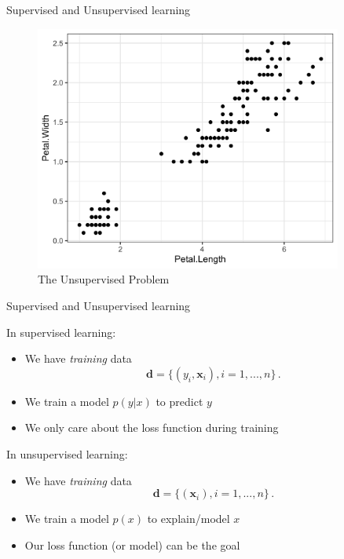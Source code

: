 \documentclass[10pt]{beamer}
\begin{document}
\begin{frame}{Supervised and Unsupervised learning}

\begin{figure}[h]
\centering
\includegraphics[width=0.9\textwidth]{fig/iris_unsupervised.png}
\caption{The Unsupervised Problem}
\end{figure}

\end{frame}


\begin{frame}{Supervised and Unsupervised learning}

In {\color{uured} supervised} learning:
\begin{itemize}
\item We have \emph{training} data
\[
\mathbf{d} = \{(y_i, \mathbf{x}_i), i = 1, ..., n\} \,.
\]
\item We train a model $p(y|x)$ to {\color{uured} predict} $y$
\item We only care about the loss function during training
\end{itemize}
\pause
In {\color{uured} unsupervised}  learning:
\begin{itemize}
\item We have \emph{training} data
\[
\mathbf{d} = \{(\mathbf{x}_i), i = 1, ..., n\} \,.
\]
\item We train a model $p(x)$ to {\color{uured} explain/model} $x$
\item Our loss function (or model) can be the goal
\end{itemize}
\end{frame}
\end{document}
